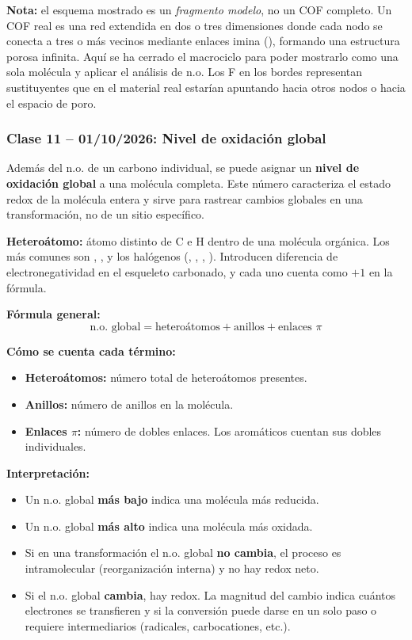 \textbf{Nota:} el esquema mostrado es un \emph{fragmento modelo}, no un COF 
completo. Un COF real es una red extendida en dos o tres dimensiones donde 
cada nodo se conecta a tres o más vecinos mediante enlaces imina 
(), formando una estructura porosa infinita. Aquí se ha cerrado 
el macrociclo para poder mostrarlo como una sola molécula y aplicar el 
análisis de n.o. Los F en los bordes representan sustituyentes que en el 
material real estarían apuntando hacia otros nodos o hacia el espacio 
de poro.

{}
\subsubsection*{\textcolor{blueunam}{Clase 11 -- 01/10/2026: Nivel de oxidación global}}

Además del n.o. de un carbono individual, se puede asignar un 
\textbf{nivel de oxidación global} a una molécula completa. Este número 
caracteriza el estado redox de la molécula entera y sirve para rastrear 
cambios globales en una transformación, no de un sitio específico.

\textbf{Heteroátomo:} átomo distinto de C e H dentro de una molécula 
orgánica. Los más comunes son , ,  y los halógenos 
(, , , ). Introducen diferencia de 
electronegatividad en el esqueleto carbonado, y cada uno cuenta como $+1$ 
en la fórmula.

\textbf{Fórmula general:}
\begin{equation}
\text{n.o. global} = \text{heteroátomos} + \text{anillos} + \text{enlaces } \pi
\end{equation}

\textbf{Cómo se cuenta cada término:}
\begin{itemize}
    \item \textbf{Heteroátomos:} número total de heteroátomos presentes.
    \item \textbf{Anillos:} número de anillos en la molécula.
    \item \textbf{Enlaces $\pi$:} número de dobles enlaces. Los aromáticos cuentan sus dobles individuales.
\end{itemize}

\textbf{Interpretación:}
\begin{itemize}
    \item Un n.o. global \textbf{más bajo} indica una molécula más reducida.
    \item Un n.o. global \textbf{más alto} indica una molécula más oxidada.
    \item Si en una transformación el n.o. global \textbf{no cambia}, el proceso 
    es intramolecular (reorganización interna) y no hay redox neto.
    \item Si el n.o. global \textbf{cambia}, hay redox. La magnitud del cambio 
    indica cuántos electrones se transfieren y si la conversión puede darse 
    en un solo paso o requiere intermediarios (radicales, carbocationes, etc.).
\end{itemize}

